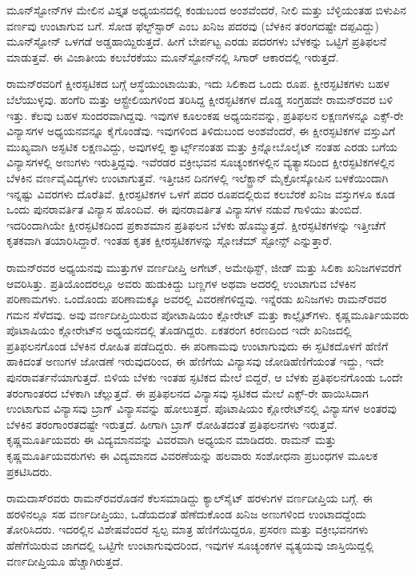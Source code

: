ಮೂನ್‍ಸ್ಟೋನ್‍ಗಳ ಮೇಲಿನ ವಿಸ್ತೃತ ಅಧ್ಯಯನದಲ್ಲಿ ಕಂಡುಬಂದ ಅಂಶವೆಂದರೆ, ನೀಲಿ ಮತ್ತು ಬೆಳ್ಳಿಯಂತಹ ಬಿಳುಪಿನ ವರ್ಣವು ಉಂಟಾಗುವ ಬಗೆ. ಸೋಡ ಫೆಲ್ಟ್‌ಸ್ಟಾರ್ ಎಂಬ ಖನಿಜ ಪದರವು (ಬೆಳಕಿನ ತರಂಗದಷ್ಟೇ ದಪ್ಪವಿದ್ದು) ಮೂನ್‍ಸ್ಟೋನ್ ಒಳಗಡೆ ಅಡ್ಡಹಾಯ್ದಿರುತ್ತದೆ. ಹೀಗೆ ಬೇರ್ಪಟ್ಟ ಎರಡು ಪದರಗಳು ಬೆಳಕನ್ನು ಒಟ್ಟಿಗೆ ಪ್ರತಿಫಲನೆ ಮಾಡುತ್ತವೆ. ಈ ವಿಜಾತೀಯ ಕಲಬೆರಕೆಯು ಮೂನ್‍ಸ್ಟೋನ್‍ನಲ್ಲಿ ಸಿಗಾರ್ ಆಕಾರದಲ್ಲಿ ಇರುತ್ತದೆ.

ರಾಮನ್‍ರವರಿಗೆ ಕ್ಷೀರಸ್ಫಟಿಕದ ಬಗ್ಗೆ ಆಸ್ಥೆಯುಂಟಾಯಿತು, ಇದು ಸಿಲಿಕಾದ ಒಂದು ರೂಪ. ಕ್ಷೀರಸ್ಫಟಿಕಗಳು ಬಹಳ ಬೆಲೆಯುಳ್ಳವು. ಹಂಗೆರಿ ಮತ್ತು ಆಸ್ಟ್ರೇಲಿಯಗಳಿಂದ ತರಿಸಿದ್ದ ಕ್ಷೀರಸ್ಫಟಿಕಗಳ ದೊಡ್ಡ ಸಂಗ್ರಹವೇ ರಾಮನ್‍ರವರ ಬಳಿ ಇತ್ತು. ಕೆಲವು ಬಹಳ ಸುಂದರವಾಗಿದ್ದವು. ಇವುಗಳ ಕೂಲಂಕಷ ಅಧ್ಯಯನವನ್ನು, ಪ್ರತಿಫಲನ ಲಕ್ಷಣಗಳನ್ನೂ ಎಕ್ಸ್-ರೇ ವಿನ್ಯಾಸಗಳ ಅಧ್ಯಯನವನ್ನೂ ಕೈಗೊಂಡೆವು. ಇವುಗಳಿಂದ ತಿಳಿದುಬಂದ ಅಂಶವೆಂದರೆ, ಈ ಕ್ಷೀರಸ್ಫಟಿಕಗಳ ವಸ್ತುವಿಗೆ ಮುಖ್ಯವಾಗಿ ಅಸ್ಫಟಿಕ ಲಕ್ಷಣವಿದ್ದು, ಅವುಗಳಲ್ಲಿ ಕ್ವಾರ್ಟ್ಸ್‌ನಂತಹ ಮತ್ತು ಕ್ರಿನ್ನೋಬೊಲೈಟ್ ನಂತಹ ಎರಡು ಬಗೆಯ ವಿನ್ಯಾಸಗಳಲ್ಲಿ ಅಣುಗಳು ಇರುತ್ತಿದ್ದವು. ಇವೆರಡರ ವಕ್ರೀಭವನ ಸೂಚ್ಯಂಕಗಳಲ್ಲಿನ ವ್ಯತ್ಯಾಸದಿಂದ ಕ್ಷೀರಸ್ಫಟಿಕಗಳಲ್ಲಿನ ಬೆಳಕಿನ ವರ್ಣವೈವಿದ್ಯಗಳು ಉಂಟಾಗುತ್ತವೆ. ಇತ್ತೀಚಿನ ದಿನಗಳಲ್ಲಿ ಇಲೆಕ್ಟ್ರಾನ್ ಮೈಕ್ರೋಸ್ಕೋಪಿನ ಬಳಕೆಯಿಂದಾಗಿ ಇನ್ನಷ್ಟು ವಿವರಗಳು ದೊರೆತಿವೆ. ಕ್ಷೀರಸ್ಫಟಿಕಗಳ ಒಳಗೆ ಪದರ ರೂಪದಲ್ಲಿರುವ ಕಲಬೆರಕೆ ಖನಿಜ ವಸ್ತುಗಳೂ ಕೂಡ ಒಂದು ಪುನರಾವರ್ತಿತ ವಿನ್ಯಾಸ ಹೊಂದಿವೆ. ಈ ಪುನರಾವರ್ತಿತ ವಿನ್ಯಾಸಗಳ ನಡುವೆ ಗಾಳಿಯು ತುಂಬಿದೆ. ಇದರಿಂದಾಗಿಯೇ ಕ್ಷೀರಸ್ಫಟಿಕದಿಂದ ಪ್ರಕಾಶಮಾನ ಪ್ರತಿಫಲನ ಬೆಳಕು ಹೊಮ್ಮುತ್ತದೆ. ಕ್ಷೀರಸ್ಫಟಿಕಗಳನ್ನು ಇತ್ತೀಚೆಗೆ ಕೃತಕವಾಗಿ ತಯಾರಿಸಿದ್ದಾರೆ. ಇಂತಹ ಕೃತಕ ಕ್ಷೀರಸ್ಫಟಿಕಗಳನ್ನು ಸ್ಲೋಚೆಮ್ ಸ್ಟೋನ್ಸ್  ಎನ್ನುತ್ತಾರೆ.

ರಾಮನ್‍ರವರ ಅಧ್ಯಯನವು ಮುತ್ತುಗಳ ವರ್ಣದೀಪ್ತಿ ಅಗೇಟ್, ಅಮೇಥಿಸ್ಟ್, ಜೀಡ್ ಮತ್ತು ಸಿಲಿಕಾ ಖನಿಜಗಳವರೆಗೆ ಆವರಿಸಿತ್ತು. ಪ್ರತಿಯೊಂದರಲ್ಲೂ ಅವರು ಹುಡುಕಿದ್ದು ಬಣ್ಣಗಳ ಅಥವಾ ಅದರಲ್ಲಿ ಉಂಟಾಗುವ ಬೆಳಕಿನ ಪರಿಣಾಮಗಳು. ಒಂದೊಂದು ಪರಿಣಾಮಕ್ಕೂ ಅವರಲ್ಲಿ ವಿವರಣೆಗಳಿದ್ದವು. ಇನ್ನೆರಡು ಖನಿಜಗಳು ರಾಮನ್‍ರವರ ಗಮನ ಸೆಳೆದವು. ಅವು ವರ್ಣದೀಪ್ತಿಯಿರುವ ಪೋಟಾಷಿಯಂ ಕ್ಲೋರೇಟ್ ಮತ್ತು ಕಾಲ್ಸೈಟ್‍ಗಳು. ಕೃಷ್ಣಮೂರ್ತಿಯವರು ಪೊಟಾಷಿಯಂ ಕ್ಲೋರೇಟ್‍ನ ಅಧ್ಯಯನದಲ್ಲಿ ತೊಡಗಿದ್ದರು. ಏಕತರಂಗ ಕಿರಣದಿಂದ ಇದೇ ಖನಿಜದಲ್ಲಿ ಪ್ರತಿಫಲನಗೊಂಡ ಬೆಳಕಿನ ರೋಹಿತ ಪಡೆದಿದ್ದರು. ಈ ಪರಿಣಾಮವು ಉಂಟಾಗುವುದು ಈ ಸ್ಫಟಿಕದೊಳಗೆ ಹೆಣಿಗೆ ಹಾಕಿದಂತೆ ಅಣುಗಳ ಜೋಡಣೆ ಇರುವುದರಿಂದ, ಈ ಹೆಣಿಗೆಯ ವಿನ್ಯಾಸವು ಜೋಡಿಹೆಣಿಗೆಯಂತೆ ಇದ್ದು, ಇದೇ ಪುನರಾವರ್ತನೆಯಾಗುತ್ತದೆ. ಬಿಳಿಯ ಬೆಳಕು ಇಂತಹ ಸ್ಫಟಿಕದ ಮೇಲೆ ಬಿದ್ದರೆ, ಆ ಬೆಳಕು ಪ್ರತಿಫಲನಗೊಂಡು ಒಂದೇ ತರಂಗಾಂತರದ ಬೆಳಕಾಗಿ ಚೆಲ್ಲುತ್ತದೆ. ಈ ಪ್ರತಿಫಲನದ ವಿನ್ಯಾಸವು ಸ್ಫಟಿಕದ ಮೇಲೆ ಎಕ್ಸ್-ರೇ ಹಾಯಿಸಿದಾಗ ಉಂಟಾಗುವ ವಿನ್ಯಾಸವು ಬ್ರಾಗ್ ವಿನ್ಯಾಸವನ್ನು ಹೋಲುತ್ತದೆ. ಪೊಟಾಷಿಯಂ ಕ್ಲೋರೇಟ್‍ನಲ್ಲಿ ವಿನ್ಯಾಸಗಳ ಅಂತರವು ಬೆಳಕಿನ ತರಂಗಾಂರತದಷ್ಟೇ ಇರುತ್ತದೆ. ಹೀಗಾಗಿ ಬ್ರಾಗ್ ರೋಹಿತದಂತೆ ಪ್ರತಿಫಲನಗಳು ಇರುತ್ತವೆ. ಕೃಷ್ಣಮೂರ್ತಿಯವರು ಈ ವಿದ್ಯಮಾನವನ್ನು ವಿವರವಾಗಿ ಅಧ್ಯಯನ ಮಾಡಿದರು. ರಾಮನ್ ಮತ್ತು ಕೃಷ್ಣಮೂರ್ತಿಯವರುಗಳು ಈ ವಿದ್ಯಮಾನದ ವಿವರಣೆಯನ್ನು ಹಲವಾರು ಸಂಶೋಧನಾ ಪ್ರಬಂಧಗಳ ಮೂಲಕ ಪ್ರಕಟಿಸಿದರು.

ರಾಮದಾಸ್‍ರವರು ರಾಮನ್‍ರವರೊಡನೆ ಕೆಲಸಮಾಡಿದ್ದು ಕ್ಯಾಲ್‍ಸೈಟ್ ಹರಳುಗಳ ವರ್ಣದೀಪ್ತಿಯ ಬಗ್ಗೆ. ಈ ಹರಳಿನಲ್ಲೂ ಸಹ ವರ್ಣದೀಪ್ತಿಯು, ಒಡೆಯದಂತೆ ಹೆಣೆದುಕೊಂಡ ಖನಿಜ ಅಣುಗಳಿಂದ ಉಂಟಾದದ್ದೆಂದು ತೋರಿಸಿದರು. ಇದರಲ್ಲಿನ ವಿಶೇಷವೆಂದರೆ ಸ್ವಲ್ಪ ಮಾತ್ರ ಹೆಣಿಗೆಯಿದ್ದರೂ, ಪ್ರಸರಣ ಮತ್ತು ವಕ್ರೀಭವನಗಳು ಹೆಣೆಗೆಯಿರುವ ಜಾಗದಲ್ಲಿ ಒಟ್ಟಿಗೇ ಉಂಟಾಗುವುದರಿಂದ, ಇವುಗಳ ಸೂಚ್ಯಂಕಗಳ ವ್ಯತ್ಯಯವು ಜಾಸ್ತಿಯಿದ್ದಲ್ಲಿ ವರ್ಣದೀಪ್ತಿಯೂ ಹೆಚ್ಚಾಗಿರುತ್ತದೆ.

